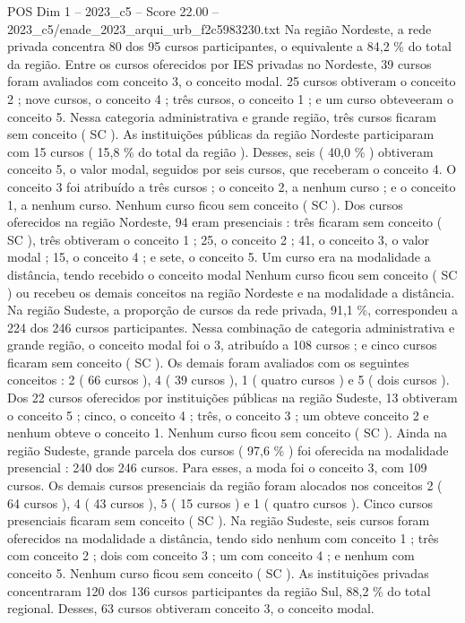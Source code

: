 \begin{textsample}{POS Dim 1 – 2023\_c5 – Score 22.00 – 2023\_c5/enade\_2023\_arqui\_urb\_f2c5983230.txt}
Na região Nordeste, a rede privada concentra 80 dos 95 cursos participantes, o equivalente a 84,2 \% do total da região.
Entre os cursos oferecidos por IES privadas no Nordeste, 39 cursos foram avaliados com conceito 3, o conceito modal. 25 cursos obtiveram o conceito 2 ; nove cursos, o conceito 4 ; três cursos, o conceito 1 ; e um curso obteveeram o conceito 5.
Nessa categoria administrativa e grande região, três cursos ficaram sem conceito ( SC ).
As instituições públicas da região Nordeste participaram com 15 cursos ( 15,8 \% do total da região ).
Desses, seis ( 40,0 \% ) obtiveram conceito 5, o valor modal, seguidos por seis cursos, que receberam o conceito 4.
O conceito 3 foi atribuído a três cursos ; o conceito 2, a nenhum curso ; e o conceito 1, a nenhum curso.
Nenhum curso ficou sem conceito ( SC ).
Dos cursos oferecidos na região Nordeste, 94 eram presenciais : três ficaram sem conceito ( SC ), três obtiveram o conceito 1 ; 25, o conceito 2 ; 41, o conceito 3, o valor modal ; 15, o conceito 4 ; e sete, o conceito 5.
Um curso era na modalidade a distância, tendo recebido o conceito modal Nenhum curso ficou sem conceito ( SC ) ou recebeu os demais conceitos na região Nordeste e na modalidade a distância.
Na região Sudeste, a proporção de cursos da rede privada, 91,1 \%, correspondeu a 224 dos 246 cursos participantes.
Nessa combinação de categoria administrativa e grande região, o conceito modal foi o 3, atribuído a 108 cursos ; e cinco cursos ficaram sem conceito ( SC ).
Os demais foram avaliados com os seguintes conceitos : 2 ( 66 cursos ), 4 ( 39 cursos ), 1 ( quatro cursos ) e 5 ( dois cursos ).
Dos 22 cursos oferecidos por instituições públicas na região Sudeste, 13 obtiveram o conceito 5 ; cinco, o conceito 4 ; três, o conceito 3 ; um obteve conceito 2 e nenhum obteve o conceito 1.
Nenhum curso ficou sem conceito ( SC ).
Ainda na região Sudeste, grande parcela dos cursos ( 97,6 \% ) foi oferecida na modalidade presencial : 240 dos 246 cursos.
Para esses, a moda foi o conceito 3, com 109 cursos.
Os demais cursos presenciais da região foram alocados nos conceitos 2 ( 64 cursos ), 4 ( 43 cursos ), 5 ( 15 cursos ) e 1 ( quatro cursos ).
Cinco cursos presenciais ficaram sem conceito ( SC ).
Na região Sudeste, seis cursos foram oferecidos na modalidade a distância, tendo sido nenhum com conceito 1 ; três com conceito 2 ; dois com conceito 3 ; um com conceito 4 ; e nenhum com conceito 5.
Nenhum curso ficou sem conceito ( SC ).
As instituições privadas concentraram 120 dos 136 cursos participantes da região Sul, 88,2 \% do total regional.
Desses, 63 cursos obtiveram conceito 3, o conceito modal.

\end{textsample}
